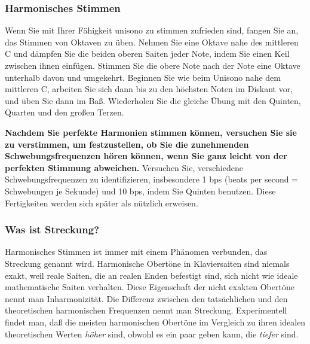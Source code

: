 \label{c2_5j}
\subsubsection{Harmonisches Stimmen}
\label{c2_5_harm}

Wenn Sie mit Ihrer Fähigkeit unisono zu stimmen zufrieden sind, fangen Sie an, das Stimmen von Oktaven zu üben.
Nehmen Sie eine Oktave nahe des mittleren C und dämpfen Sie die beiden oberen Saiten jeder Note, indem Sie einen Keil zwischen ihnen einfügen.
Stimmen Sie die obere Note nach der Note eine Oktave unterhalb davon und umgekehrt.
Beginnen Sie wie beim Unisono nahe dem mittleren C, arbeiten Sie sich dann bis zu den höchsten Noten im Diskant vor, und üben Sie dann im Baß.
Wiederholen Sie die gleiche Übung mit den Quinten, Quarten und den großen Terzen.

\textbf{Nachdem Sie perfekte Harmonien stimmen können, versuchen Sie sie zu verstimmen, um festzustellen, ob Sie die zunehmenden Schwebungsfrequenzen hören können, wenn Sie ganz leicht von der perfekten Stimmung abweichen.}
Versuchen Sie, verschiedene Schwebungsfrequenzen zu identifizieren, insbesondere 1 bps (beats per second = Schwebungen je Sekunde) und 10 bps, indem Sie Quinten benutzen.
Diese Fertigkeiten werden sich später als nützlich erweisen.
 

\label{c2_5k}
\subsubsection{Was ist Streckung?}
\label{c2_5_stre}

Harmonisches Stimmen ist immer mit einem Phänomen verbunden, das Streckung genannt wird.
Harmonische Obertöne in Klaviersaiten sind niemals exakt, weil reale Saiten, die an realen Enden befestigt sind, sich nicht wie ideale mathematische Saiten verhalten.
Diese Eigenschaft der nicht exakten Obertöne nennt man Inharmonizität.
Die Differenz zwischen den tatsächlichen und den theoretischen harmonischen Frequenzen nennt man Streckung.
Experimentell findet man, daß die meisten harmonischen Obertöne im Vergleich zu ihren idealen theoretischen Werten \textit{höher} sind, obwohl es ein paar geben kann, die \textit{tiefer} sind.


